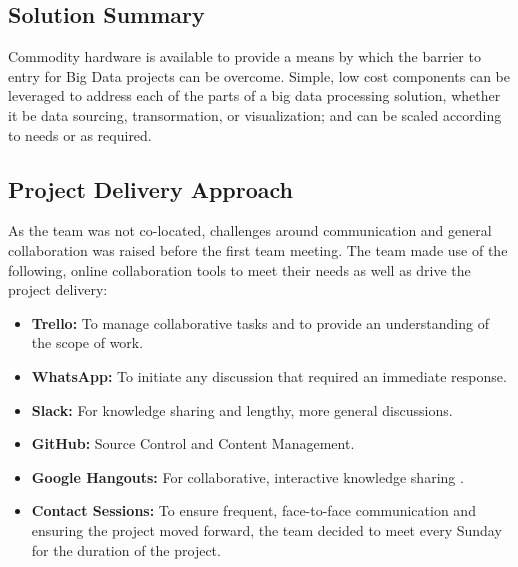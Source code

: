 \documentclass[12pt]{article} %
\begin{document}
\subsection{Solution Summary}

Commodity hardware is available to provide a means by which the barrier to entry for Big Data projects can be overcome. Simple, low cost components can be leveraged to address each of the parts of a big data processing solution, whether it be data sourcing, transormation, or visualization; and can be scaled according to needs or as required.

\subsection{Project Delivery Approach}

As the team was not co-located, challenges around communication and general collaboration was raised before the first team meeting. 
The team made use of the following, online collaboration tools to meet their needs as well as drive the project delivery:
\begin{itemize}
	\item \textbf{Trello:} To manage collaborative tasks and to provide an understanding of the scope of work.
	\item \textbf{WhatsApp:} To initiate any discussion that required an immediate response.
	\item \textbf{Slack:} For knowledge sharing and lengthy, more general discussions.
	\item \textbf{GitHub:} Source Control and Content Management.
	\item \textbf{Google Hangouts:} For collaborative, interactive knowledge sharing .
	\item \textbf{Contact Sessions:} To ensure frequent, face-to-face communication and ensuring the project moved forward, the team decided to meet every Sunday for the duration of the project. 
\end{itemize}

	
		
\end{document}
